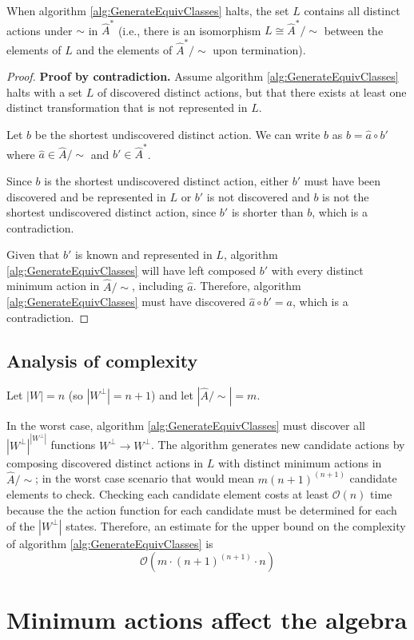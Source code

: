 \begin{proposition}
    When algorithm \ref{alg:GenerateEquivClasses} halts, the set $L$ contains all distinct actions under $\sim$ in $\hat{A}^{*}$ (i.e., there is an isomorphism $L \cong \hat{A}^{*}/\sim$ between the elements of $L$ and the elements of $\hat{A}^{*}/\sim$ upon termination).
\end{proposition}
\begin{proof}
    \textbf{Proof by contradiction.}
    Assume algorithm \ref{alg:GenerateEquivClasses} halts with a set $L$ of discovered distinct actions, but that there exists at least one distinct transformation that is not represented in $L$.

    Let $b$ be the shortest undiscovered distinct action.
    We can write $b$ as $b = \hat{a} \circ b'$ where $\hat{a} \in \hat{A}/\sim$ and $b' \in \hat{A}^{\ast}$.

    Since $b$ is the shortest undiscovered distinct action, either $b'$ must have been discovered and be represented in $L$ or $b'$ is not discovered and $b$ is not the shortest undiscovered distinct action, since $b'$ is shorter than $b$, which is a contradiction.

    Given that $b'$ is known and represented in $L$, algorithm \ref{alg:GenerateEquivClasses} will have left composed $b'$ with every distinct minimum action in $\hat{A}/\sim$, including $\hat{a}$.
    Therefore, algorithm \ref{alg:GenerateEquivClasses} must have discovered $\hat{a} \circ b' = a$, which is a contradiction.
\end{proof}


\subsection{Analysis of complexity}

Let $|W| = n$ (so $|W^{\bot}| = n+1$) and let $|\hat{A}/\sim| = m$.

In the worst case, algorithm \ref{alg:GenerateEquivClasses} must discover all $|W^{\bot}|^{|W^{\bot}|}$ functions $W^{\bot} \to W^{\bot}$.
The algorithm generates new candidate actions by composing discovered distinct actions in $L$ with distinct minimum actions in $\hat{A}/\sim$; in the worst case scenario that would mean $m (n+1)^{(n+1)}$ candidate elements to check.
Checking each candidate element costs at least $\mathcal{O}(n)$ time because the the action function for each candidate must be determined for each of the $|W^{\bot}|$ states.
Therefore, an estimate for the upper bound on the complexity of algorithm \ref{alg:GenerateEquivClasses} is
\begin{equation}
    \mathcal{O}(m \cdot (n+1)^{(n+1)} \cdot n)
\end{equation}





\section{Minimum actions affect the algebra}
